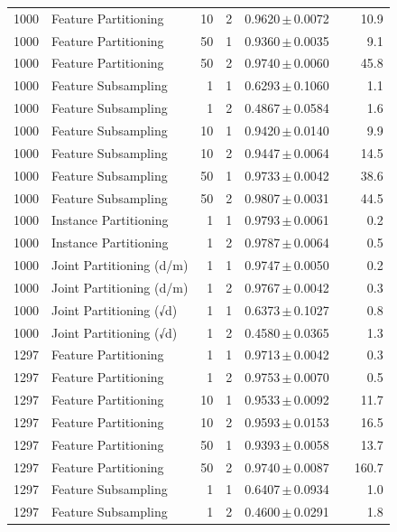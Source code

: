 \begin{table}[ht]
\begin{tabular}{rlrrccr}
1000 & Feature Partitioning & 10 & 2 & 0.9620\,$\pm$\,0.0072 &  & 10.9 \\
1000 & Feature Partitioning & 50 & 1 & 0.9360\,$\pm$\,0.0035 &  & 9.1 \\
1000 & Feature Partitioning & 50 & 2 & 0.9740\,$\pm$\,0.0060 &  & 45.8 \\
1000 & Feature Subsampling & 1 & 1 & 0.6293\,$\pm$\,0.1060 &  & 1.1 \\
1000 & Feature Subsampling & 1 & 2 & 0.4867\,$\pm$\,0.0584 &  & 1.6 \\
1000 & Feature Subsampling & 10 & 1 & 0.9420\,$\pm$\,0.0140 &  & 9.9 \\
1000 & Feature Subsampling & 10 & 2 & 0.9447\,$\pm$\,0.0064 &  & 14.5 \\
1000 & Feature Subsampling & 50 & 1 & 0.9733\,$\pm$\,0.0042 &  & 38.6 \\
1000 & Feature Subsampling & 50 & 2 & 0.9807\,$\pm$\,0.0031 &  & 44.5 \\
1000 & Instance Partitioning & 1 & 1 & 0.9793\,$\pm$\,0.0061 &  & 0.2 \\
1000 & Instance Partitioning & 1 & 2 & 0.9787\,$\pm$\,0.0064 &  & 0.5 \\
1000 & Joint Partitioning (d/m) & 1 & 1 & 0.9747\,$\pm$\,0.0050 &  & 0.2 \\
1000 & Joint Partitioning (d/m) & 1 & 2 & 0.9767\,$\pm$\,0.0042 &  & 0.3 \\
1000 & Joint Partitioning (√d) & 1 & 1 & 0.6373\,$\pm$\,0.1027 &  & 0.8 \\
1000 & Joint Partitioning (√d) & 1 & 2 & 0.4580\,$\pm$\,0.0365 &  & 1.3 \\
1297 & Feature Partitioning & 1 & 1 & 0.9713\,$\pm$\,0.0042 &  & 0.3 \\
1297 & Feature Partitioning & 1 & 2 & 0.9753\,$\pm$\,0.0070 &  & 0.5 \\
1297 & Feature Partitioning & 10 & 1 & 0.9533\,$\pm$\,0.0092 &  & 11.7 \\
1297 & Feature Partitioning & 10 & 2 & 0.9593\,$\pm$\,0.0153 &  & 16.5 \\
1297 & Feature Partitioning & 50 & 1 & 0.9393\,$\pm$\,0.0058 &  & 13.7 \\
1297 & Feature Partitioning & 50 & 2 & 0.9740\,$\pm$\,0.0087 &  & 160.7 \\
1297 & Feature Subsampling & 1 & 1 & 0.6407\,$\pm$\,0.0934 &  & 1.0 \\
1297 & Feature Subsampling & 1 & 2 & 0.4600\,$\pm$\,0.0291 &  & 1.8 \\

\end{tabular}
\end{table}
